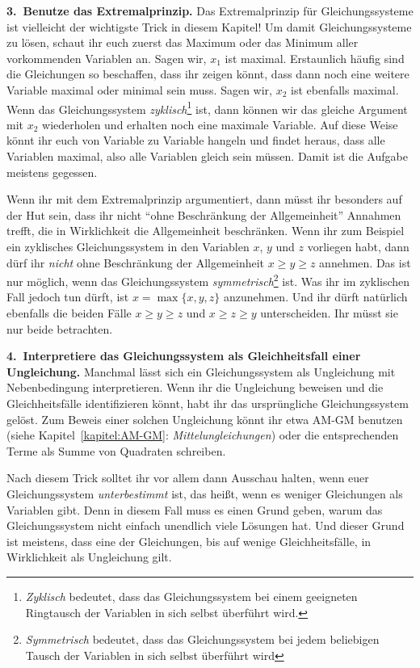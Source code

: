 \textbf{3.~Benutze das Extremalprinzip.} Das Extremalprinzip für Gleichungssysteme ist vielleicht der wichtigste Trick in diesem Kapitel! Um damit Gleichungssysteme zu lösen, schaut ihr euch zuerst das Maximum oder das Minimum aller vorkommenden Variablen an. Sagen wir, $x_1$ ist maximal. Erstaunlich häufig sind die Gleichungen so beschaffen, dass ihr zeigen könnt, dass dann noch eine weitere Variable maximal oder minimal sein muss. Sagen wir, $x_2$ ist ebenfalls maximal. Wenn das Gleichungssystem \emph{zyklisch}\footnote{\emph{Zyklisch} bedeutet, dass das Gleichungssystem bei einem geeigneten Ringtausch der Variablen in sich selbst überführt wird.} ist, dann können wir das gleiche Argument mit $x_2$ wiederholen und erhalten noch eine maximale Variable. Auf diese Weise könnt ihr euch von Variable zu Variable hangeln und findet heraus, dass alle Variablen maximal, also alle Variablen gleich sein müssen. Damit ist die Aufgabe meistens gegessen.

Wenn ihr mit dem Extremalprinzip argumentiert, dann müsst ihr besonders auf der Hut sein, dass ihr nicht \enquote{ohne Beschränkung der Allgemeinheit} Annahmen trefft, die in Wirklichkeit die Allgemeinheit beschränken. Wenn ihr zum Beispiel ein zyklisches Gleichungssystem in den Variablen $x$, $y$ und $z$ vorliegen habt, dann dürf ihr \emph{nicht} ohne Beschränkung der Allgemeinheit $x\geqslant y\geqslant z$ annehmen. Das ist nur möglich, wenn das Gleichungssystem \emph{symmetrisch}\footnote{\emph{Symmetrisch} bedeutet, dass das Gleichungssystem bei jedem beliebigen Tausch der Variablen in sich selbst überführt wird} ist. Was ihr im zyklischen Fall jedoch tun dürft, ist $x=\max\{x,y,z\}$ anzunehmen. Und ihr dürft natürlich ebenfalls die beiden Fälle $x\geqslant y\geqslant z$ und $x\geqslant z\geqslant y$ unterscheiden. Ihr müsst sie nur beide betrachten.


\textbf{4.~Interpretiere das Gleichungssystem als Gleichheitsfall einer Ungleichung.} Manchmal lässt sich ein Gleichungssystem als Ungleichung mit Nebenbedingung interpretieren. Wenn ihr die Ungleichung beweisen und die Gleichheitsfälle identifizieren könnt, habt ihr das ursprüngliche Gleichungssystem gelöst. Zum Beweis einer solchen Ungleichung könnt ihr etwa AM-GM benutzen (siehe Kapitel~\ref{kapitel:AM-GM}: \emph{Mittelungleichungen}) oder die entsprechenden Terme als Summe von Quadraten schreiben.

Nach diesem Trick solltet ihr vor allem dann Ausschau halten, wenn euer Gleichungssystem \emph{unterbestimmt} ist, das heißt, wenn es weniger Gleichungen als Variablen gibt. Denn in diesem Fall muss es einen Grund geben, warum das Gleichungssystem nicht einfach unendlich viele Lösungen hat. Und dieser Grund ist meistens, dass eine der Gleichungen, bis auf wenige Gleichheitsfälle, in Wirklichkeit als Ungleichung gilt.

